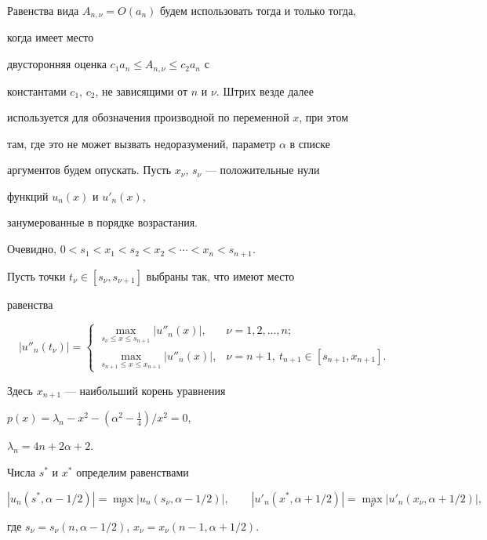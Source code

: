 Равенства вида $A_{n,\nu}=O(a_n)$ будем использовать тогда и только тогда,


когда имеет место


двусторонняя оценка ${{c_1}{a_n}}\leq{A_{n,\nu}}\leq{{{c_2}{a_n}}}$ с 


константами $c_1$, $c_2$, не зависящими от $n$ и $\nu$. Штрих везде далее


используется для обозначения производной по переменной $x$, при этом


там, где это не может вызвать недоразумений, параметр $\alpha$ в списке


аргументов будем опускать. Пусть $x_\nu$, $s_\nu$ --- положительные нули


функций $u_n(x)$ и $u'_n(x)$,


занумерованные в порядке возрастания. 


Очевидно, $0<s_1<x_1<s_2<x_2<\dotsb<x_n<s_{n+1}$.


Пусть точки ${t_\nu}\in[s_\nu,s_{\nu+1}]$ выбраны так, что имеют место


равенства


$$


|u''_n(t_\nu)|=


\begin{cases}


\max\limits_{s_\nu\leq x\leq s_{n+1}}


|u''_n(x)|,& \nu=1,2,\dotsc,n;\\


\max\limits_{s_{n+1}\leq x\leq x_{n+1}}


|u''_n(x)|,& \nu=n+1,\ t_{n+1}\in[s_{n+1},x_{n+1}].


\end{cases}


$$


Здесь $x_{n+1}$ --- наибольший корень уравнения


$p(x)=\lambda_n-x^2-(\alpha^2-\frac14)/x^2=0$,


$\lambda_n=4n+2\alpha+2$.


Числа $s^\ast$ и $x^\ast$ определим равенствами


$$


|u_n(s^\ast,\alpha-1/2)|=


\max_{\nu}| u_n(s_\nu,\alpha-1/2)|,\qquad


|u'_n(x^\ast,\alpha+1/2)|=


\max_{\nu}| u'_n(x_\nu,\alpha+1/2)|,


$$ 


где $s_\nu=s_\nu(n,\alpha-1/2)$, $x_\nu=x_\nu(n-1,\alpha+1/2)$.


